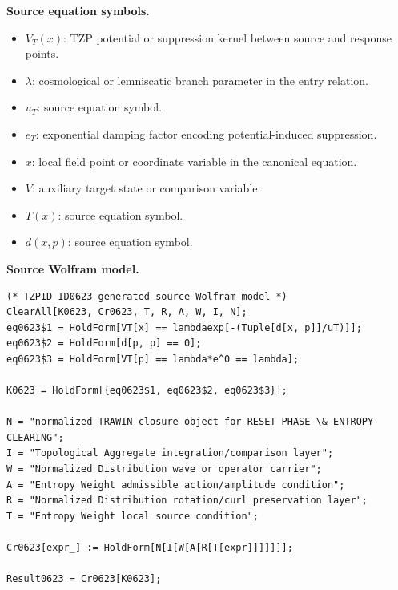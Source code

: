\begin{minipage}[t]{0.49\linewidth}
\begingroup
\small
\raggedright
\textbf{Source equation symbols.}\par
\begin{itemize}[leftmargin=1.35em,itemsep=1pt,topsep=1pt,parsep=0pt]
    \item $V_T(x)$: TZP potential or suppression kernel between source and response points.
    \item $\lambda$: cosmological or lemniscatic branch parameter in the entry relation.
    \item $u_T$: source equation symbol.
    \item $e_T$: exponential damping factor encoding potential-induced suppression.
    \item $x$: local field point or coordinate variable in the canonical equation.
    \item $V$: auxiliary target state or comparison variable.
    \item $T(x)$: source equation symbol.
    \item $d(x,p)$: source equation symbol.
\end{itemize}
\endgroup
\end{minipage}\hfill
\begin{minipage}[t]{0.47\linewidth}
\begingroup
\scriptsize
\raggedright
\textbf{Source Wolfram model.}\par
\begin{Verbatim}[fontsize=\tiny,breaklines=true,breakanywhere=true]
(* TZPID ID0623 generated source Wolfram model *)
ClearAll[K0623, Cr0623, T, R, A, W, I, N];
eq0623$1 = HoldForm[VT[x] == lambdaexp[-(Tuple[d[x, p]]/uT)]];
eq0623$2 = HoldForm[d[p, p] == 0];
eq0623$3 = HoldForm[VT[p] == lambda*e^0 == lambda];

K0623 = HoldForm[{eq0623$1, eq0623$2, eq0623$3}];

N = "normalized TRAWIN closure object for RESET PHASE \& ENTROPY CLEARING";
I = "Topological Aggregate integration/comparison layer";
W = "Normalized Distribution wave or operator carrier";
A = "Entropy Weight admissible action/amplitude condition";
R = "Normalized Distribution rotation/curl preservation layer";
T = "Entropy Weight local source condition";

Cr0623[expr_] := HoldForm[N[I[W[A[R[T[expr]]]]]]];

Result0623 = Cr0623[K0623];
\end{Verbatim}
\endgroup
\end{minipage}


